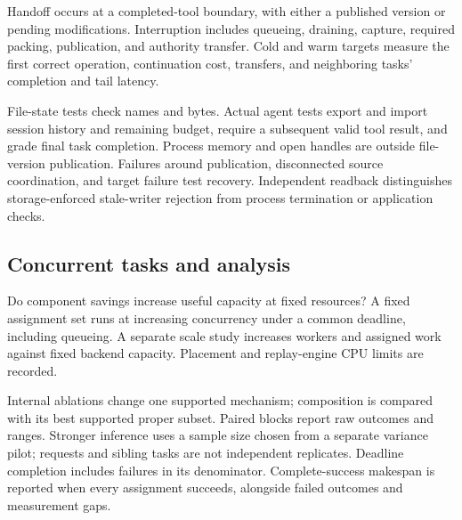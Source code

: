 Handoff occurs at a completed-tool boundary, with either a published
version or pending modifications. Interruption includes queueing,
draining, capture, required packing, publication, and authority transfer.
Cold and warm targets measure the first correct operation, continuation
cost, transfers, and neighboring tasks' completion and tail latency.

File-state tests check names and bytes. Actual agent tests export and
import session history and remaining budget, require a subsequent valid
tool result, and grade final task completion. Process memory and open
handles are outside file-version publication. Failures around publication,
disconnected source coordination, and target failure test recovery.
Independent readback distinguishes storage-enforced stale-writer
rejection from process termination or application checks.

\subsection{Concurrent tasks and analysis}

 Do component savings increase useful capacity at fixed
resources?
A fixed assignment set runs at increasing concurrency under a common
deadline, including queueing. A separate scale study increases workers
and assigned work against fixed backend capacity. Placement and
replay-engine CPU limits are recorded.

Internal ablations change one supported mechanism; composition is
compared with its best supported proper subset. Paired blocks report
raw outcomes and ranges. Stronger inference uses a sample size chosen
from a separate variance pilot; requests and sibling tasks are not
independent replicates. Deadline completion includes failures in its
denominator. Complete-success makespan is reported when every assignment
succeeds, alongside failed outcomes and measurement gaps.
